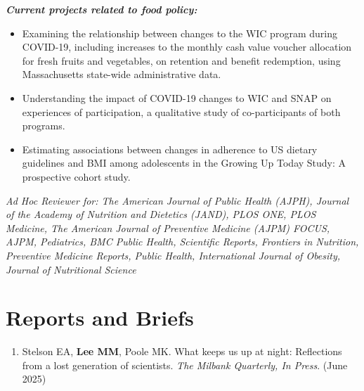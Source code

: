 \documentclass{cv_style}
\begin{document}
\vspace{1em}
\textit{\textbf{Current projects related to food policy:}}
\begin{itemize}
    \item Examining the relationship between changes to the WIC program during COVID-19, including increases to the monthly cash value voucher allocation for fresh fruits and vegetables, on retention and benefit redemption, using Massachusetts state-wide administrative data. \parskip 1pt
    \item Understanding the impact of COVID-19 changes to WIC and SNAP on experiences of participation, a qualitative study of co-participants of both programs. \parskip 1pt
    \item Estimating associations between changes in adherence to US dietary guidelines and BMI among adolescents in the Growing Up Today Study: A prospective cohort study.
\end{itemize}




\parskip -5pt 
\nocite{*}
\printbibliography[title=Publications]

\vspace{2em}

\textit{Ad Hoc Reviewer for: The American Journal of Public Health (AJPH), Journal of the Academy of Nutrition and Dietetics (JAND), PLOS ONE, PLOS Medicine, The American Journal of Preventive Medicine (AJPM) FOCUS, AJPM, Pediatrics, BMC Public Health, Scientific Reports, Frontiers in Nutrition, Preventive Medicine Reports, Public Health, International Journal of Obesity, Journal of Nutritional Science}

\section{Reports and Briefs}

\begin{enumerate}[leftmargin = 2em]
    \item Stelson EA, \textbf{Lee MM}, Poole MK. What keeps us up at night: Reflections from a lost generation of scientists. \textit{The Milbank Quarterly, In Press}. (June 2025)
\end{enumerate}
\end{document}
